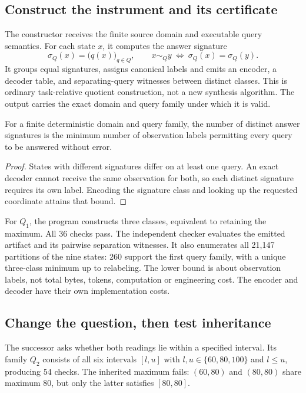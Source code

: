 \subsection{Construct the instrument and its certificate}
The constructor receives the finite source domain and executable query semantics. For each state $x$, it computes the answer signature
\begin{equation}
\sigma_Q(x)=\big(q(x)\big)_{q\in Q},\qquad
x\sim_Q y\ \Longleftrightarrow\ \sigma_Q(x)=\sigma_Q(y).
\end{equation}
It groups equal signatures, assigns canonical labels and emits an encoder, a decoder table, and separating-query witnesses between distinct classes. This is ordinary task-relative quotient construction, not a new synthesis algorithm. The output carries the exact domain and query family under which it is valid.

\begin{proposition}
For a finite deterministic domain and query family, the number of distinct answer signatures is the minimum number of observation labels permitting every query to be answered without error.
\end{proposition}
\begin{proof}
States with different signatures differ on at least one query. An exact decoder cannot receive the same observation for both, so each distinct signature requires its own label. Encoding the signature class and looking up the requested coordinate attains that bound.
\end{proof}

For $Q_1$, the program constructs three classes, equivalent to retaining the maximum. All 36 checks pass. The independent checker evaluates the emitted artifact and its pairwise separation witnesses. It also enumerates all 21,147 partitions of the nine states: 260 support the first query family, with a unique three-class minimum up to relabeling. The lower bound is about observation labels, not total bytes, tokens, computation or engineering cost. The encoder and decoder have their own implementation costs.

\subsection{Change the question, then test inheritance}
The successor asks whether both readings lie within a specified interval. Its family $Q_2$ consists of all six intervals $[l,u]$ with $l,u\in\{60,80,100\}$ and $l\leq u$, producing 54 checks. The inherited maximum fails: $(60,80)$ and $(80,80)$ share maximum 80, but only the latter satisfies $[80,80]$.

